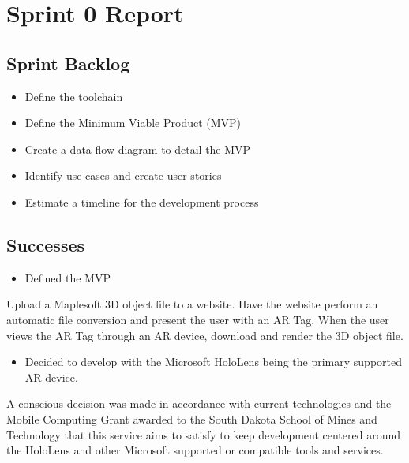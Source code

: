 
\section{Sprint 0 Report}
\label{sec:Sprint0_report}
    \subsection{Sprint Backlog}
    \label{sec:Sprint0_backlog}
        \begin{itemize}
            \item Define the toolchain
            \item Define the Minimum Viable Product (MVP)
            \item Create a data flow diagram to detail the MVP            
            \item Identify use cases and create user stories
            \item Estimate a timeline for the development process
        \end{itemize}

    \subsection{Successes}
    \label{sec:Sprint0_successes}
        \begin{itemize} \item Defined the MVP \end{itemize}
        \hspace{7mm}
        Upload a Maplesoft 3D object file to a website.  Have the website perform an automatic file conversion and 
        present the user with an AR Tag.  When the user views the AR Tag through an AR device, download and render 
        the 3D object file.

        \begin{itemize} \item Decided to develop with the Microsoft HoloLens being the primary supported AR device. \end{itemize}
        \hspace{7mm} 
        A conscious decision was made in accordance with current technologies and the Mobile Computing Grant awarded 
        to the South Dakota School of Mines and Technology that this service aims to satisfy to keep development 
        centered around the HoloLens and other Microsoft supported or compatible tools and services.

